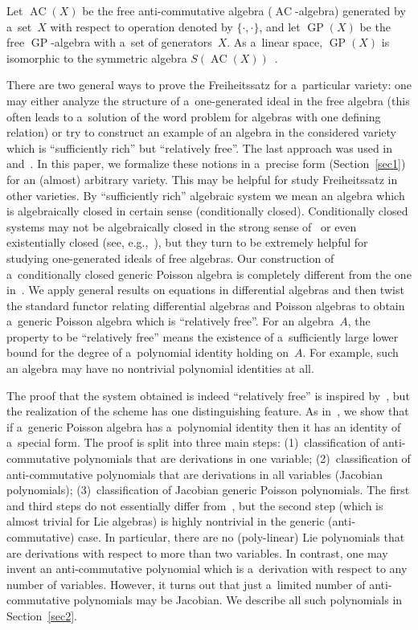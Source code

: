 \documentclass[pdftex]{sigma}
\begin{document}
Let $\operatorname{AC}(X)$ be the free anti-commutative algebra ($\operatorname{AC}$-algebra) generated by a~set~$X$ with respect to operation denoted
by $\{\cdot,\cdot\}$, and let $\operatorname{GP}(X)$ be the free $\operatorname{GP}$-algebra with a~set of generators~$X$.
As a~linear space, $\operatorname{GP}(X)$ is isomorphic to the symmetric algebra $S(\operatorname{AC}(X))$~\cite{Shest1993}.

There are two general ways to prove the Freiheitssatz for a~particular variety: one may either analyze the structure of
a~one-generated ideal in the free algebra (this often leads to a~solution of the word problem for algebras with one
def\/ining relation) or try to construct an example of an algebra in the considered variety which is ``suf\/f\/iciently rich''
but ``relatively free''.
The last approach was used in~\cite{LML85} and~\cite{MLU10}.
In this paper, we formalize these notions in a~precise form (Section~\ref{sec1}) for an (almost) arbitrary variety.
This may be helpful for study Freiheitssatz in other varieties.
By ``suf\/f\/iciently rich'' algebraic system we mean an algebra which is algebraically closed in certain sense
(conditionally closed).
Conditionally closed systems may not be algebraically closed in the strong sense of~\cite{Bokut66} or even existentially
closed (see, e.g.,~\cite{Higman}), but they turn to be extremely helpful for studying one-generated ideals of free
algebras.
Our construction of a~conditionally closed generic Poisson algebra is completely dif\/ferent from the one in~\cite{MLU10}.
We apply general results on equations in dif\/ferential algebras and then twist the standard functor relating dif\/ferential
algebras and Poisson algebras to obtain a~generic Poisson algebra which is ``relatively free''.
For an algebra~$A$, the property to be ``relatively free'' means the existence of a~suf\/f\/iciently large lower bound for
the degree of a~polynomial identity holding on~$A$.
For example, such an algebra may have no nontrivial polynomial identities at all.

The proof that the system obtained is indeed ``relatively free'' is inspired by~\cite{FarkasI}, but the reali\-za\-tion of
the scheme has one distinguishing feature.
As in~\cite{FarkasI}, we show that if a~generic Poisson algebra has a~polynomial identity then it has an identity of
a~special form.
The proof is split into three main steps: (1)~classif\/ication of anti-commutative polynomials that are derivations in one
variable; (2)~classif\/ication of anti-commutative polynomials that are derivations in all variables (Jacobian
polynomials); (3)~classif\/ication of Jacobian generic Poisson polynomials.
The f\/irst and third steps do not essentially dif\/fer from~\cite{FarkasI}, but the second step (which is almost trivial
for Lie algebras) is highly nontrivial in the generic (anti-commutative) case.
In particular, there are no (poly-linear) Lie polynomials that are derivations with respect to more than two variables.
In contrast, one may invent an anti-commutative polynomial which is a~derivation with respect to any number of
variables.
However, it turns out that just a~limited number of anti-commutative polynomials may be Jacobian.
We describe all such polynomials in Section~\ref{sec2}.
\end{document}
